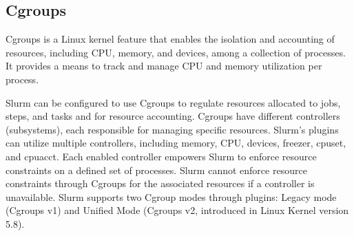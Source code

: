 \subsection{Cgroups}
Cgroups \cite{7876184} is a Linux kernel feature that enables the isolation and accounting of resources, including CPU, memory, and devices, among a collection of processes. It provides a means to track and manage CPU and memory utilization per process.

Slurm can be configured to use Cgroups to regulate resources allocated to jobs, steps, and tasks and for resource accounting. Cgroups have different controllers (subsystems), each responsible for managing specific resources. Slurm's plugins can utilize multiple controllers, including memory, CPU, devices, freezer, cpuset, and cpuacct. Each enabled controller empowers Slurm to enforce resource constraints on a defined set of processes. Slurm cannot enforce resource constraints through Cgroups for the associated resources if a controller is unavailable. Slurm supports two Cgroup modes through plugins: Legacy mode (Cgroups v1) and Unified Mode (Cgroups v2, introduced in Linux Kernel version 5.8).


